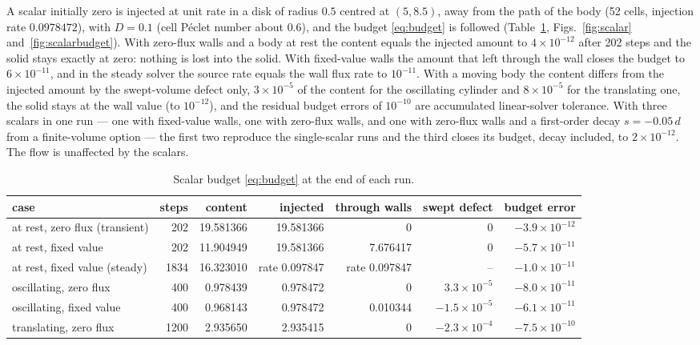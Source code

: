 \documentclass[11pt,a4paper]{article}
\theoremstyle{remark}
\begin{document}
A scalar initially zero is injected at unit rate in a disk of radius $0.5$ centred at
$(5,8.5)$, away from the path of the body (52 cells, injection rate $0.0978472$), with $D=0.1$
(cell P\'eclet number about $0.6$), and the budget \eqref{eq:budget} is followed
(Table~\ref{tab:scalar}, Figs.~\ref{fig:scalar} and~\ref{fig:scalarbudget}). With zero-flux walls
and a body at rest the content equals the injected amount to $4\times10^{-12}$ after 202 steps
and the solid stays exactly at zero: nothing is lost into the solid. With fixed-value walls the
amount that left through the wall closes the budget to $6\times10^{-11}$, and in the steady
solver the source rate equals the wall flux rate to $10^{-11}$.
With a moving body the content differs from the injected amount by the swept-volume defect only,
$3\times10^{-5}$ of the content for the oscillating cylinder and $8\times10^{-5}$ for the
translating one, the solid stays at the wall value (to $10^{-12}$), and the residual budget
errors of $10^{-10}$ are accumulated linear-solver tolerance.
With three scalars in one run --- one with fixed-value walls, one with zero-flux walls, and one
with zero-flux walls and a first-order decay $s=-0.05\,d$ from a finite-volume option --- the
first two reproduce the single-scalar runs and the third closes its budget, decay included,
to $2\times10^{-12}$. The flow is unaffected by the scalars.

\begin{table}[htbp]\centering\footnotesize
\caption{Scalar budget \eqref{eq:budget} at the end of each run.}
\label{tab:scalar}
\setlength{\tabcolsep}{4pt}
\begin{tabular}{@{}lrrrrrr@{}}
\toprule
case & steps & content & injected & through walls & swept defect & budget error\\
\midrule
at rest, zero flux (transient) & 202 & 19.581366 & 19.581366 & 0 & 0 & $-3.9\times10^{-12}$\\
at rest, fixed value & 202 & 11.904949 & 19.581366 & 7.676417 & 0 & $-5.7\times10^{-11}$\\
at rest, fixed value (steady) & 1834 & 16.323010 & rate 0.097847 & rate 0.097847 & -- & $-1.0\times10^{-11}$\\
oscillating, zero flux & 400 & 0.978439 & 0.978472 & 0 & $3.3\times10^{-5}$ & $-8.0\times10^{-11}$\\
oscillating, fixed value & 400 & 0.968143 & 0.978472 & 0.010344 & $-1.5\times10^{-5}$ & $-6.1\times10^{-11}$\\
translating, zero flux & 1200 & 2.935650 & 2.935415 & 0 & $-2.3\times10^{-4}$ & $-7.5\times10^{-10}$\\
\bottomrule
\end{tabular}
\end{table}
\end{document}
